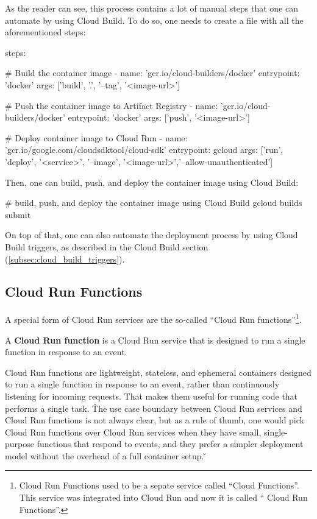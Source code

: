 As the reader can see, this process contains a lot of manual steps that one can automate by using Cloud Build. To do so,
one needs to create a  file with all the aforementioned steps:
\begin{block}
steps:

    $\#$ Build the container image
    - name: 'gcr.io/cloud-builders/docker'
      entrypoint: 'docker'
      args: ['build', '.', '--tag', '<image-url>']

    $\#$ Push the container image to Artifact Registry
    - name: 'gcr.io/cloud-builders/docker'
      entrypoint: 'docker'
      args: ['push', '<image-url>']

    $\#$ Deploy container image to Cloud Run
    - name: 'gcr.io/google.com/cloudsdktool/cloud-sdk'
      entrypoint: gcloud
      args: ['run', 'deploy', '<service>', '--image', '<image-url>','--allow-unauthenticated']
\end{block}

Then, one can build, push, and deploy the container image using Cloud Build:
\begin{bash}
# build, push, and deploy the container image using Cloud Build
gcloud builds submit
\end{bash}

On top of that, one can also automate the deployment process by using Cloud Build triggers, as described in the
Cloud Build section (\ref{subsec:cloud_build_triggers}).

\subsection{Cloud Run Functions}

A special form of Cloud Run services are the so-called ``Cloud Run functions''\footnote{Cloud Run Functions used to be
a sepate service called ``Cloud Functions''. This service was integrated into Cloud Run and now it is called `` Cloud
Run Functions''.}.

A \textbf{Cloud Run function} is a Cloud Run service that is designed to run a single function in response to an event.
\ed

Cloud Run functions are lightweight, stateless, and ephemeral containers designed to run a single function in response
to an event, rather than continuously listening for incoming requests. That makes them useful for running code that
performs a single task. \v

The use case boundary between Cloud Run services and Cloud Run functions is not always clear, but as a rule of
thumb, one would pick Cloud Run functions over Cloud Run services when they have small, single-purpose functions
that respond to events, and they prefer a simpler deployment model without the overhead of a full container setup. \v

